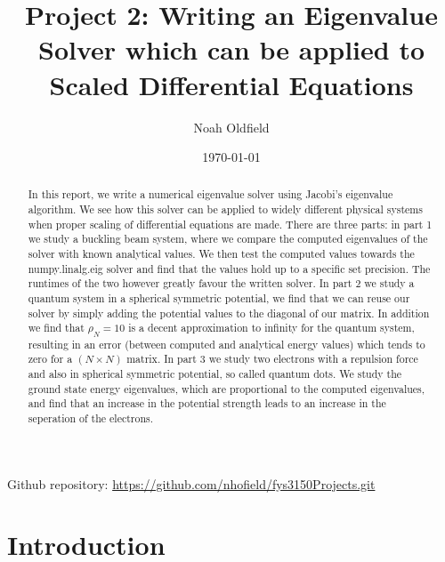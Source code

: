 \documentclass[aip,nobalancelastpage,
twocolumn,
rsi,%
 amsmath,amssymb,
 reprint,%
]{revtex4}
\begin{document}

\title{Project 2: Writing an Eigenvalue Solver which can be applied to Scaled Differential Equations}

\author{Noah Oldfield}

%

\date{\today}%

\begin{abstract}
In this report, we write a numerical eigenvalue solver using Jacobi's eigenvalue algorithm. We see how this solver can be applied to widely different physical systems when proper scaling of differential equations are made. There are three parts: in part 1 we study a buckling beam system, where we compare the computed eigenvalues of the solver with known analytical values. We then test the computed values towards the numpy.linalg.eig solver and find that the values hold up to a specific set precision. The runtimes of the two however greatly favour the written solver. In part 2 we study a quantum system in a spherical symmetric potential, we find that we can reuse our solver by simply adding the potential values to the diagonal of our matrix. In addition we find that $\rho_N=10$ is a decent approximation to infinity for the quantum system, resulting in an error (between computed and analytical energy values) which tends to zero for a $(N \times N)$ matrix. In part 3 we study two electrons with a repulsion force and also in spherical symmetric potential, so called quantum dots. We study the ground state energy eigenvalues, which are proportional to the computed eigenvalues, and find that an increase in the potential strength leads to an increase in the seperation of the electrons.

\end{abstract}

\maketitle

Github repository: \url{https://github.com/nhofield/fys3150Projects.git} 

\section{Introduction}
\end{document}
